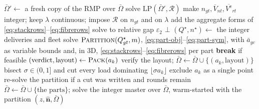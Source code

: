 \begin{algorithm}[!htb]
\caption{$\textsc{Construct}(\bar\Omega,\mathcal{R})$ --- the flow-first
relax and fix. Line 4, the rows of line 12 and lines 15--27 apply under
3D loading only. $\varepsilon_{2}$
is step~2's relative MIP gap and \emph{tol} the tolerance above which
artificial slack means the region admits no plan over this pool.}
\label{alg:construct}
\begin{algorithmic}[1]
\State $\bar\Omega'\gets$ a fresh copy of the RMP over $\bar\Omega$
\State solve $\mathrm{LP}(\bar\Omega',\mathcal{R})$
\State make $n_{gt},\overline{V}_{nt},\overline{V^{\mathrm{e}}}_{rt}$ integer;
   keep $\lambda$ continuous; impose $\mathcal{R}$ on $n_{gt}$ and on $\lambda$
\State add the aggregate forms of \eqref{eq:stackrows}--\eqref{eq:fibrerows}
\State solve to relative gap $\varepsilon_{2}$
   \State \Return $\bot$  \EndIf
\State $(Q^{\star},n^{\star})\gets$ the integer deliveries and fleet
      \State solve $\textsc{Partition}(Q^{\star}_{gt},m)$,
             \eqref{eq:part-obj}--\eqref{eq:part-sym}, with $\bar a_{gc}$ as
             variable bounds and, in 3D,
             \eqref{eq:stackrows}--\eqref{eq:fibrerows} per part
      \State \textbf{break} if feasible
   \EndFor
      \State $(\text{verdict},\text{layout})\gets\textsc{Pack}(a_{k})$
       \State verify the layout;
          $\bar\Omega\gets\bar\Omega\cup\{(a_{k},\text{layout})\}$ \EndIf
       \State bisect $\sigma\in(0,1]$ and cut
          every load dominating $\lfloor\sigma a_{k}\rfloor$
           \EndIf
       \State exclude $a_{k}$ as a single point
           \EndIf
   \EndFor
   \State re-solve the partition if a cut was written and rounds remain
\EndFor
\State $\bar\Omega\gets\bar\Omega\cup\{\text{the parts}\}$; solve the integer
   master over $\bar\Omega$, warm-started with the partition
\State \Return $(z,\hat{\mathbf{n}},\bar\Omega)$
\end{algorithmic}
\end{algorithm}
